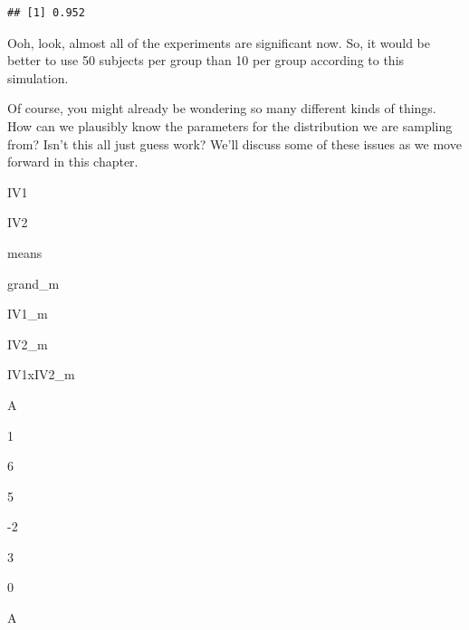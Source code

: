 \documentclass[
]{book}
\newenvironment{Shaded}{\begin{snugshade}}{\end{snugshade}}
\newcommand{\ControlFlowTok}[1]{\textcolor[rgb]{0.13,0.29,0.53}{\textbf{#1}}}
\newcommand{\DataTypeTok}[1]{\textcolor[rgb]{0.13,0.29,0.53}{#1}}
\newcommand{\DecValTok}[1]{\textcolor[rgb]{0.00,0.00,0.81}{#1}}
\newcommand{\FloatTok}[1]{\textcolor[rgb]{0.00,0.00,0.81}{#1}}
\newcommand{\KeywordTok}[1]{\textcolor[rgb]{0.13,0.29,0.53}{\textbf{#1}}}
\newcommand{\NormalTok}[1]{#1}
\newcommand{\OperatorTok}[1]{\textcolor[rgb]{0.81,0.36,0.00}{\textbf{#1}}}
\newcommand{\OtherTok}[1]{\textcolor[rgb]{0.56,0.35,0.01}{#1}}
\newcommand{\StringTok}[1]{\textcolor[rgb]{0.31,0.60,0.02}{#1}}
\begin{document}
\begin{Shaded}
\end{Shaded}

\begin{verbatim}
## [1] 0.952
\end{verbatim}

Ooh, look, almost all of the experiments are significant now. So, it would be better to use 50 subjects per group than 10 per group according to this simulation.

Of course, you might already be wondering so many different kinds of things. How can we plausibly know the parameters for the distribution we are sampling from? Isn't this all just guess work? We'll discuss some of these issues as we move forward in this chapter.

IV1

IV2

means

grand\_m

IV1\_m

IV2\_m

IV1xIV2\_m

A

1

6

5

-2

3

0

A
\end{document}
